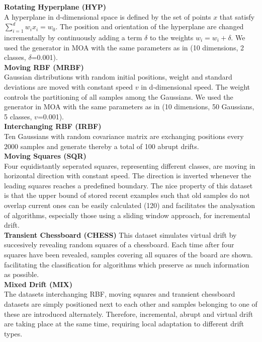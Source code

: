 \documentclass[conference]{IEEEtran}
\begin{document}
\textbf{Rotating Hyperplane (HYP)}\\
A hyperplane in d-dimensional space is defined by the set of points $x$ that satisfy $\sum_{i=1}^{d}w_ix_i=w_0$. The position and orientation of the hyperplane
are changed incrementally by continuously adding a term $\delta$ to the weights $w_i=w_i+\delta$. 
We used the generator in MOA with the same parameters as in \cite{Bifet:2013:EDS:2480362.2480516} (10 dimensions, 2 classes, $\delta$=0.001).\\ 
\textbf{Moving RBF (MRBF)}\\
Gaussian distributions with random initial positions, weight and standard deviations are moved with constant speed $v$ in d-dimensional speed. 
The weight controls the partitioning of all samples among the Gaussians.
We used the generator in MOA with the same parameters as in \cite{Bifet:2013:EDS:2480362.2480516} (10 dimensions, 50 Gaussians, 5 classes, $v$=0.001).\\ 
\textbf{Interchanging RBF (IRBF)}\\
Ten Gaussians with random covariance matrix are exchanging positions every $2000$ samples and generate thereby a total of 100 abrupt drifts.\\ 
\textbf{Moving Squares (SQR)}\\
Four equidistantly seperated squares, representing different classes, are moving in horizontal direction with constant speed. The direction is inverted whenever the leading squares reaches a predefined boundary.
The nice property of this dataset is that the upper bound of stored recent examples such that old samples do not overlap current ones can be easily calculated (120) and  
facilitates the analysation of algorithms, especially those using a sliding window approach, for incremental drift.\\
\textbf{Transient Chessboard (CHESS)}
This dataset simulates virtual drift by succesively revealing random squares of a chessboard. Each time after four squares have been revealed, samples covering all squares of the board are shown.
facilitating the classification for algorithms which preserve as much information as possible.\\ 
\textbf{Mixed Drift (MIX)} \\
The datasets interchanging RBF, moving squares and transient chessboard datasets are simply positioned next to each other and samples belonging to one of these are introduced alternately.
Therefore, incremental, abrupt and virtual drift are taking place at the same time, requiring local adaptation to different drift types.\\
\end{document}
